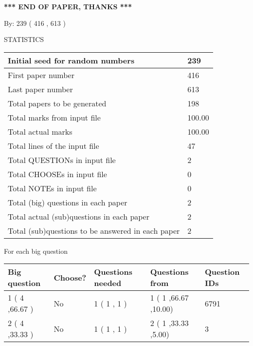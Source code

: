 \documentclass[12pt]{article}
\begin{document}
   
   
   
   
\vspace{1.0in} 
{\textbf{\large{ *** END OF PAPER, THANKS *** }}} 
   
   
\hspace{1.0in} By: 
 239 ( 416 ,  613 )
   
   
   
\vspace{0.2in}
\vspace{0.2in}
   
   
 \newpage
\setcounter{page}{1} 
   
   
 {\LARGE{STATISTICS}}
   
\vspace{0.2in}
   
 \begin{tabular}{|l|l|}
 \hline
 Initial seed for random numbers & 239  \\
\hline
 First paper number & 416  \\
\hline
 Last  paper number & 613  \\
\hline
 Total papers to be generated & 198  \\
\hline
Total marks from input file & 100.00 \\
\hline
Total actual marks & 100.00 \\
\hline
 Total lines of the input file & 47  \\
 \hline
 Total QUESTIONs in input file & 2  \\
\hline
 Total CHOOSEs in input file & 0  \\
\hline
 Total NOTEs in input file & 0  \\
\hline
 Total (big) questions in each paper & 2  \\
\hline
 Total actual (sub)questions in each paper & 2  \\
\hline
 Total (sub)questions to be answered in each paper & 2  \\
\hline
 \end{tabular}
   
   
 \newpage
   
{\LARGE{For each big question}}
   
   
\vspace{0.2in}
   
   
\noindent\hspace{-0.4in}\begin{tabular}{|l|l|l|l|l|}
\hline
 Big question & Choose? & Questions needed & Questions from & Question IDs \\ 
\hline
 1 ( 4 ,66.67
 ) &  No   & 
 1 ( 1 ,  1 ) &  1 ( 1
,66.67
 ,10.00) &  6791  \\
 \hline
 2 ( 4 ,33.33
 ) &  No   & 
 1 ( 1 ,  1 ) &  2 ( 1
,33.33
 ,5.00) &  3  \\
 \hline
 \end{tabular}
 
 
\end{document}
